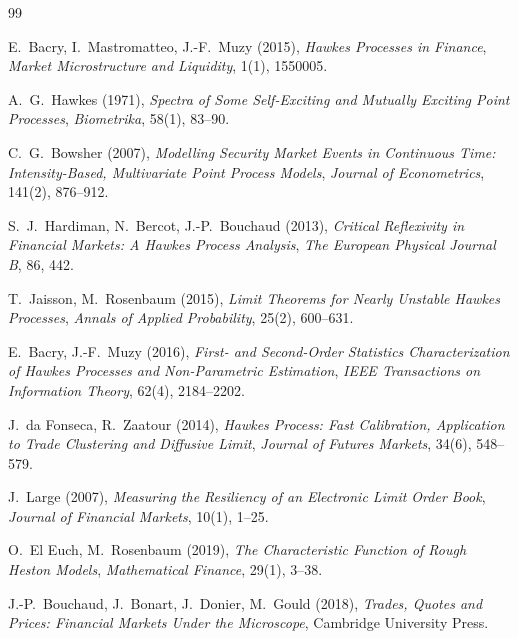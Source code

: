 \documentclass[11pt,a4paper]{article}
\begin{document}
\begin{thebibliography}{99}

E.~Bacry, I.~Mastromatteo, J.-F.~Muzy (2015),
\newblock \emph{Hawkes Processes in Finance},
\newblock \emph{Market Microstructure and Liquidity}, 1(1), 1550005.

A.~G.~Hawkes (1971),
\newblock \emph{Spectra of Some Self-Exciting and Mutually Exciting Point Processes},
\newblock \emph{Biometrika}, 58(1), 83--90.

C.~G.~Bowsher (2007),
\newblock \emph{Modelling Security Market Events in Continuous Time: Intensity-Based, Multivariate Point Process Models},
\newblock \emph{Journal of Econometrics}, 141(2), 876--912.

S.~J.~Hardiman, N.~Bercot, J.-P.~Bouchaud (2013),
\newblock \emph{Critical Reflexivity in Financial Markets: A Hawkes Process Analysis},
\newblock \emph{The European Physical Journal B}, 86, 442.

T.~Jaisson, M.~Rosenbaum (2015),
\newblock \emph{Limit Theorems for Nearly Unstable Hawkes Processes},
\newblock \emph{Annals of Applied Probability}, 25(2), 600--631.

E.~Bacry, J.-F.~Muzy (2016),
\newblock \emph{First- and Second-Order Statistics Characterization of Hawkes Processes and Non-Parametric Estimation},
\newblock \emph{IEEE Transactions on Information Theory}, 62(4), 2184--2202.

J.~da Fonseca, R.~Zaatour (2014),
\newblock \emph{Hawkes Process: Fast Calibration, Application to Trade Clustering and Diffusive Limit},
\newblock \emph{Journal of Futures Markets}, 34(6), 548--579.

J.~Large (2007),
\newblock \emph{Measuring the Resiliency of an Electronic Limit Order Book},
\newblock \emph{Journal of Financial Markets}, 10(1), 1--25.

O.~El Euch, M.~Rosenbaum (2019),
\newblock \emph{The Characteristic Function of Rough Heston Models},
\newblock \emph{Mathematical Finance}, 29(1), 3--38.

J.-P.~Bouchaud, J.~Bonart, J.~Donier, M.~Gould (2018),
\newblock \emph{Trades, Quotes and Prices: Financial Markets Under the Microscope},
\newblock Cambridge University Press.

\end{thebibliography}
\end{document}
